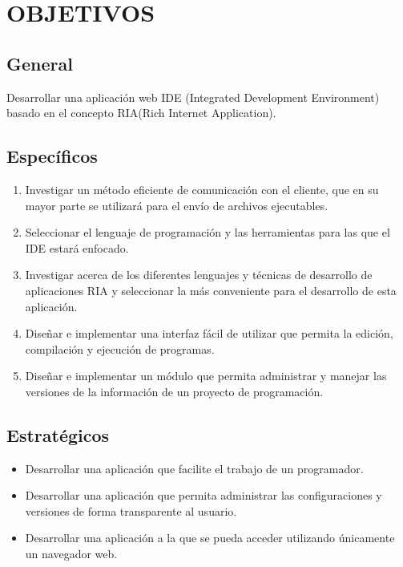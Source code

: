 \section{OBJETIVOS}

\subsection{General}
\label{objetive:general}
Desarrollar una aplicación web IDE (Integrated Development Environment) basado en el concepto RIA(Rich Internet Application).

\subsection{Específicos}

\label{objetive:especifics}
\begin{enumerate}
	
	\item Investigar un método eficiente de comunicación con el cliente, que en su mayor parte se utilizará para el envío de archivos ejecutables.
	
	\item Seleccionar el lenguaje de programación y las herramientas para las que el IDE estará enfocado.
	
	\item Investigar acerca de los diferentes lenguajes y técnicas de desarrollo de aplicaciones RIA y seleccionar la más conveniente para el desarrollo de esta aplicación.
	
	\item Diseñar e implementar una interfaz fácil de utilizar que permita la edición, compilación y ejecución de programas.
	
	\item Diseñar e implementar un módulo que permita administrar y manejar las versiones de la información de un proyecto de programación.
	
\end{enumerate}


\subsection{Estratégicos}

\begin{itemize}

	\item Desarrollar una aplicación que facilite el trabajo de un programador.
	
	\item Desarrollar una aplicación que permita administrar las configuraciones y versiones de forma transparente al usuario.
	
	\item Desarrollar una aplicación a la que se pueda acceder utilizando únicamente un navegador web.
	
\end{itemize}
